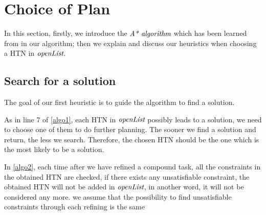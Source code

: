 \section{Choice of Plan}
In this section, firstly, we introduce the $\emph{A* algorithm}$ which has been learned from in our algorithm; then we explain and discuss our heuristics when choosing a HTN in $\emph{openList}$.

\subsection{Search for a solution}
The goal of our first heuristic is to guide the algorithm to find a solution.

As in line 7 of \autoref{algo1}, each HTN in $\emph{openList}$ possibly leads to a solution, we need to choose one of them to do further planning. The sooner we find a solution and return, the less we search. Therefore, the chosen HTN should be the one which is the most likely to be a solution.

In \autoref{algo2}, each time after we have refined a compound task, all the constraints in the obtained HTN are checked, if there exists any unsatisfiable constraint, the obtained HTN will not be added in $\emph{openList}$, in another word, it will not be considered any more.
we assume that the possibility to find unsatisfiable constraints through each refining is the same

